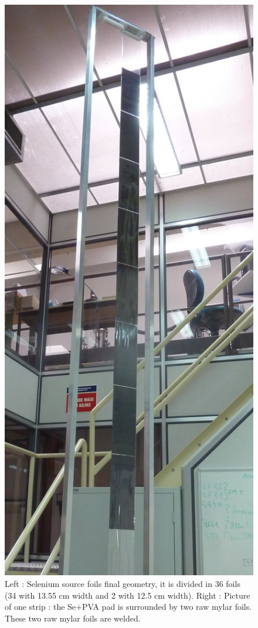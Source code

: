 \documentclass[main.tex]{subfiles}
\begin{document}
\begin{figure}[h!]
\begin{center}
\includegraphics[scale=0.075]{pictures/Chap3/P1090162.JPG}
\caption{Left : Selenium source foils final geometry, it is divided in 36 foils
(34 with 13.55 cm width and 2 with 12.5 cm width). Right : Picture of one strip : the Se+PVA pad is surrounded by two raw mylar foils. These
two raw mylar foils are welded.} 
\label{SuperNEMOFoils}
\end{center}
\end{figure}
\end{document}
